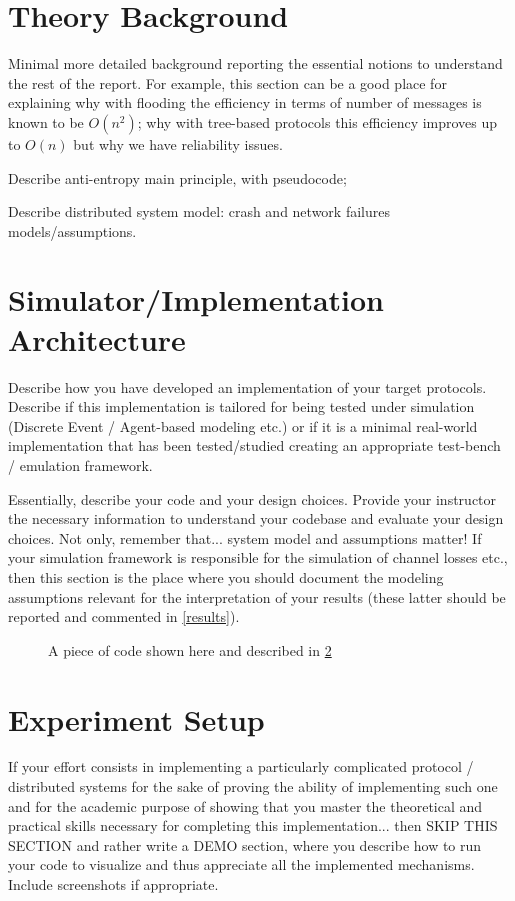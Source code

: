 \documentclass[11pt]{scrartcl} %
\begin{document}
\section{Theory Background}\label{background}
Minimal more detailed background reporting the essential notions to understand the rest of the report.
For example, this section can be a good place for explaining why with flooding the efficiency in terms of number of messages
is known to be $O(n^2)$; why with tree-based protocols this efficiency improves up to $O(n)$ but why we have reliability issues.

Describe anti-entropy main principle, with pseudocode;

Describe distributed system model: crash and network failures models/assumptions.

\section{Simulator/Implementation Architecture}\label{architecture}
Describe how you have developed an implementation of your target protocols. Describe if this implementation is tailored for being
tested under simulation (Discrete Event / Agent-based modeling etc.) or if it is a minimal real-world implementation that has been
tested/studied creating an appropriate test-bench / emulation framework.

Essentially, describe your code and your design choices. Provide your instructor the necessary information to understand
your codebase and evaluate your design choices. Not only, remember that... system model and assumptions matter!
If your simulation framework is responsible for the simulation of channel losses etc., then this section is the place where you should 
document the modeling assumptions relevant for the interpretation of your results (these latter should be reported and commented in \cref{results}).

\begin{figure}[h]
\caption{A piece of code shown here and described in \cref{architecture}}

\end{figure}




\section{Experiment Setup}\label{expSetup}
If your effort consists in implementing a particularly complicated protocol / distributed systems for the sake of proving
the ability of implementing such one and for the academic purpose of showing that you master the theoretical and practical
skills necessary for completing this implementation... then SKIP THIS SECTION and rather write a DEMO section, where you describe
how to run your code to visualize and thus appreciate all the implemented mechanisms. Include screenshots if appropriate.
\end{document}
